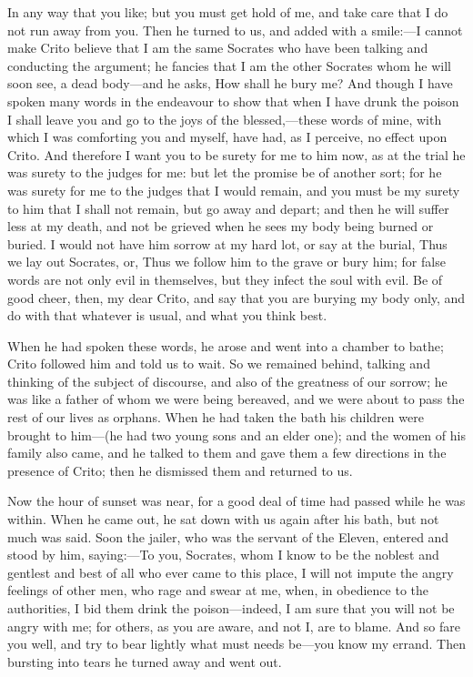 \documentclass[11pt,letter]{article}
\begin{document}
\par  In any way that you like; but you must get hold of me, and take care that I do not run away from you. Then he turned to us, and added with a smile:—I cannot make Crito believe that I am the same Socrates who have been talking and conducting the argument; he fancies that I am the other Socrates whom he will soon see, a dead body—and he asks, How shall he bury me? And though I have spoken many words in the endeavour to show that when I have drunk the poison I shall leave you and go to the joys of the blessed,—these words of mine, with which I was comforting you and myself, have had, as I perceive, no effect upon Crito. And therefore I want you to be surety for me to him now, as at the trial he was surety to the judges for me: but let the promise be of another sort; for he was surety for me to the judges that I would remain, and you must be my surety to him that I shall not remain, but go away and depart; and then he will suffer less at my death, and not be grieved when he sees my body being burned or buried. I would not have him sorrow at my hard lot, or say at the burial, Thus we lay out Socrates, or, Thus we follow him to the grave or bury him; for false words are not only evil in themselves, but they infect the soul with evil. Be of good cheer, then, my dear Crito, and say that you are burying my body only, and do with that whatever is usual, and what you think best.

\par  When he had spoken these words, he arose and went into a chamber to bathe; Crito followed him and told us to wait. So we remained behind, talking and thinking of the subject of discourse, and also of the greatness of our sorrow; he was like a father of whom we were being bereaved, and we were about to pass the rest of our lives as orphans. When he had taken the bath his children were brought to him—(he had two young sons and an elder one); and the women of his family also came, and he talked to them and gave them a few directions in the presence of Crito; then he dismissed them and returned to us.

\par  Now the hour of sunset was near, for a good deal of time had passed while he was within. When he came out, he sat down with us again after his bath, but not much was said. Soon the jailer, who was the servant of the Eleven, entered and stood by him, saying:—To you, Socrates, whom I know to be the noblest and gentlest and best of all who ever came to this place, I will not impute the angry feelings of other men, who rage and swear at me, when, in obedience to the authorities, I bid them drink the poison—indeed, I am sure that you will not be angry with me; for others, as you are aware, and not I, are to blame. And so fare you well, and try to bear lightly what must needs be—you know my errand. Then bursting into tears he turned away and went out.
\end{document}
